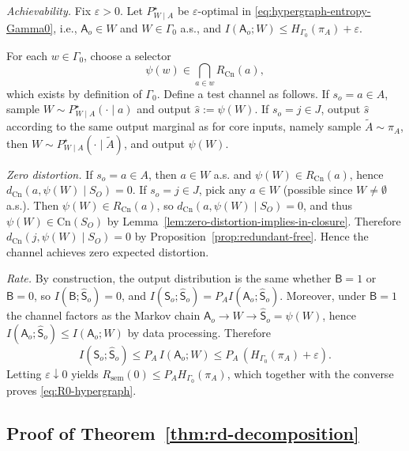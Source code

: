 \documentclass[journal,onecolumn]{IEEEtran}
\makeatletter
\newcommand{\Cn}{\text{Cn}}
\numberwithin{equation}{section}
\renewenvironment{proof}[1][\proofname]{\par
  \pushQED{\qed}%
  \normalfont \topsep6\p@\@plus6\p@\relax
  \trivlist
  \item[\hskip\labelsep
        \itshape
    #1\@addpunct{.}]\ignorespaces
}{%
  \popQED\endtrivlist\@endpefalse
}
\makeatother
\begin{document}
\begin{proof}
\smallskip\noindent
\emph{Achievability.}
Fix \(\varepsilon>0\).
Let \(P^{\star}_{W\mid A}\) be \(\varepsilon\)-optimal in \eqref{eq:hypergraph-entropy-Gamma0}, i.e.,
\(\mathsf{A}_o\in W\) and \(W\in\Gamma_0\) a.s., and
\(I(\mathsf{A}_o;W)\le H_{\Gamma_0}(\pi_A)+\varepsilon\).

For each \(w\in\Gamma_0\), choose a selector
\[
  \psi(w)\in \bigcap_{a\in w}R_{\Cn}(a),
\]
which exists by definition of \(\Gamma_0\).
Define a test channel as follows.
If \(s_o=a\in A\), sample \(W\sim P^{\star}_{W\mid A}(\cdot\mid a)\) and output
\(\hat s:=\psi(W)\).
If \(s_o=j\in J\), output \(\hat s\) according to the same output marginal as for core inputs,
namely sample \(\tilde A\sim\pi_A\), then \(W\sim P^{\star}_{W\mid A}(\cdot\mid \tilde A)\), and output \(\psi(W)\).

\emph{Zero distortion.}
If \(s_o=a\in A\), then \(a\in W\) a.s. and \(\psi(W)\in R_{\Cn}(a)\), hence
\(d_{\Cn}(a,\psi(W)\mid S_O)=0\).
If \(s_o=j\in J\), pick any \(a\in W\) (possible since \(W\neq\emptyset\) a.s.).
Then \(\psi(W)\in R_{\Cn}(a)\), so \(d_{\Cn}(a,\psi(W)\mid S_O)=0\), and thus
\(\psi(W)\in\Cn(S_O)\) by Lemma~\ref{lem:zero-distortion-implies-in-closure}.
Therefore \(d_{\Cn}(j,\psi(W)\mid S_O)=0\) by Proposition~\ref{prop:redundant-free}.
Hence the channel achieves zero expected distortion.

\emph{Rate.}
By construction, the output distribution is the same whether \(\mathsf{B}=1\) or \(\mathsf{B}=0\),
so \(I(\mathsf{B};\hat{\mathsf{S}}_o)=0\), and
\(I(\mathsf{S}_o;\hat{\mathsf{S}}_o)=P_A I(\mathsf{A}_o;\hat{\mathsf{S}}_o)\).
Moreover, under \(\mathsf{B}=1\) the channel factors as the Markov chain
\(\mathsf{A}_o\to W\to \hat{\mathsf{S}}_o=\psi(W)\), hence
\(I(\mathsf{A}_o;\hat{\mathsf{S}}_o)\le I(\mathsf{A}_o;W)\) by data processing.
Therefore
\[
  I(\mathsf{S}_o;\hat{\mathsf{S}}_o)
  \le
  P_A\,I(\mathsf{A}_o;W)
  \le
  P_A\,(H_{\Gamma_0}(\pi_A)+\varepsilon).
\]
Letting \(\varepsilon\downarrow 0\) yields \(R_{\mathrm{sem}}(0)\le P_A H_{\Gamma_0}(\pi_A)\),
which together with the converse proves \eqref{eq:R0-hypergraph}.
\end{proof}

\subsection{Proof of Theorem~\ref{thm:rd-decomposition}}
\label{app:proof-rd-decomposition}
\end{document}
